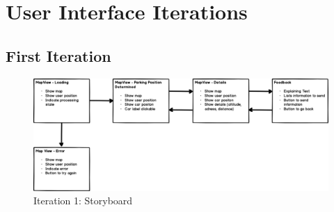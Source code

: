 \chapter{User Interface Iterations}
\label{appendix:userInterface}

\section*{First Iteration}
\begin{figure}[H]
    \centering
    \includegraphics[width=\textwidth]{images/UI/Iteration1-Overview.png}
    \caption{Iteration 1: Storyboard}
    \label{fig:i1story}
\end{figure}


